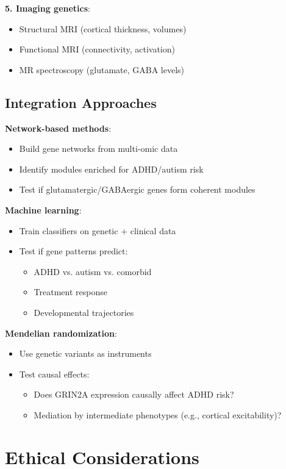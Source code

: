 \documentclass[12pt,letterpaper]{article}
\begin{document}
\textbf{5. Imaging genetics}:
\begin{itemize}
    \item Structural MRI (cortical thickness, volumes)
    \item Functional MRI (connectivity, activation)
    \item MR spectroscopy (glutamate, GABA levels)
\end{itemize}

\subsection{Integration Approaches}

\textbf{Network-based methods}:
\begin{itemize}
    \item Build gene networks from multi-omic data
    \item Identify modules enriched for ADHD/autism risk
    \item Test if glutamatergic/GABAergic genes form coherent modules
\end{itemize}

\textbf{Machine learning}:
\begin{itemize}
    \item Train classifiers on genetic + clinical data
    \item Test if gene patterns predict:
    \begin{itemize}
        \item ADHD vs. autism vs. comorbid
        \item Treatment response
        \item Developmental trajectories
    \end{itemize}
\end{itemize}

\textbf{Mendelian randomization}:
\begin{itemize}
    \item Use genetic variants as instruments
    \item Test causal effects:
    \begin{itemize}
        \item Does GRIN2A expression causally affect ADHD risk?
        \item Mediation by intermediate phenotypes (e.g., cortical excitability)?
    \end{itemize}
\end{itemize}

\section{Ethical Considerations}
\end{document}
